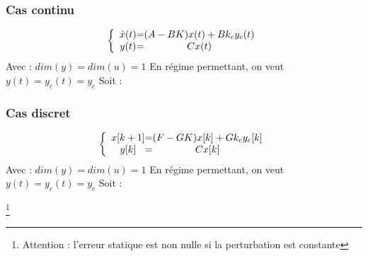 \subsubsection{Cas continu}
\Large{
    \[
\left \{
\begin{array}{c @{=} c}
    \dot x(t) & (A - BK)x(t) + Bk_{c}y_{c}(t)\\
    y(t) & Cx(t)
\end{array}
\right.
\]
\large{
Avec : $dim(y) = dim(u) = 1$\newline
En régime permettant, on veut $y(t) = y_{c}(t) = y_{c}$ \newline
Soit :}
\begin{center}
\end{center} 
\subsubsection{Cas discret}
\Large{
\[
\left \{
\begin{array}{c @{=} c}
    x[k+1] & (F - GK)x[k] + Gk_{c}y_{c}[k]\\
    y[k] & Cx[k]
\end{array}
\right.
\]
\large{
Avec : $dim(y) = dim(u) = 1$\newline
En régime permettant, on veut $y(t) = y_{c}(t) = y_{c}$ \newline
Soit :}
\begin{center}
\end{center} 
\footnote{Attention : l'erreur statique est non nulle si la perturbation est constante}
}}
